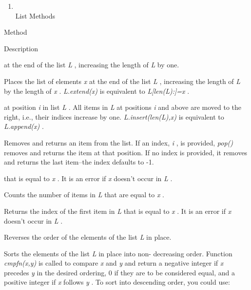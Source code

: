 \begin{enumerate}

\item
  \\
  List Methods
\end{enumerate}

Method

Description



 at the end of the
list \emph{L} , increasing the length of \emph{L} by one.



Places the list of elements
\emph{x} at the end of the list \emph{L} , increasing the length of
\emph{L} by the length of \emph{x} . \emph{L.extend(x)} is equivalent to
\emph{L{[}len(L):{]}=x} .



 at position
\emph{i} in list \emph{L} . All items in \emph{L} at positions \emph{i}
and above are moved to the right, i.e., their indices increase by one.
\emph{L.insert(len(L),x)} is equivalent to \emph{L.append(x)} .





Removes and returns an item from
the list. If an index, \emph{i} , is provided, \emph{pop()} removes and
returns the item at that position. If no index is provided, it removes
and returns the last item--the index defaults to -1.




that is equal to \emph{x} . It is an error if \emph{x} doesn't occur in
\emph{L} .



Counts the number of items in
\emph{L} that are equal to \emph{x} .



Returns the index of the first item
in \emph{L} that is equal to \emph{x} . It is an error if \emph{x}
doesn't occur in \emph{L} .



Reverses the order of the elements
of the list \emph{L} in place.





Sorts the elements of the list
\emph{L} in place into non- decreasing order. Function \emph{cmpfn(x,y)}
is called to compare \emph{x} and \emph{y} and return a negative integer
if \emph{x} precedes \emph{y} in the desired ordering, 0 if they are to
be considered equal, and a positive integer if \emph{x} follows \emph{y}
. To sort into descending order, you could use:

